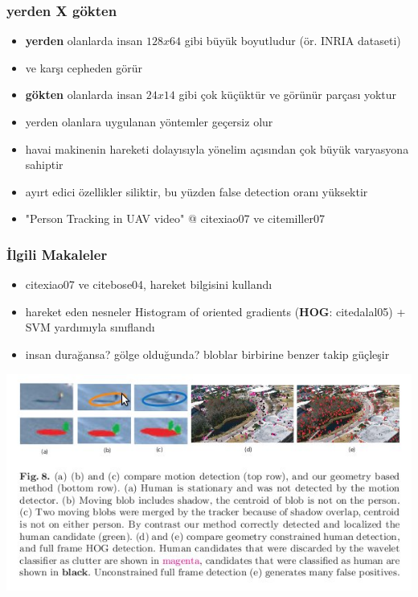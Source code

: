\documentclass{beamer}
\begin{document}
\begin{frame}
	\frametitle{yerden X gökten}

	\begin{itemize}
		\item \textbf{yerden} olanlarda insan $128x64$ gibi büyük boyutludur (ör. INRIA
			  dataseti)
		\item ve karşı cepheden görür
		\item \textbf{gökten} olanlarda insan $24x14$ gibi çok küçüktür ve
			  görünür parçası yoktur
		\item yerden olanlara uygulanan yöntemler geçersiz olur
		\item havai makinenin hareketi dolayısıyla yönelim açısından çok büyük
			  varyasyona sahiptir
		\item ayırt edici özellikler siliktir, bu yüzden false detection oranı
			  yüksektir
		\item "Person Tracking in UAV video" @ cite{xiao07} ve cite{miller07}
	\end{itemize}
\end{frame}

\begin{frame}
	\frametitle {İlgili Makaleler}

	\begin{itemize}
		\item cite{xiao07} ve cite{bose04}, hareket bilgisini kullandı
		\item hareket eden nesneler Histogram of oriented gradients
			  (\textbf{HOG}: cite{dalal05}) + SVM yardımıyla sınıflandı
		\item insan durağansa? gölge olduğunda? bloblar birbirine benzer takip
			  güçleşir
	\end{itemize}
\end{frame}

\begin{frame}
	\includegraphics[width=1.0\textwidth]{img/fig8.jpg}
\end{frame}
\end{document}
